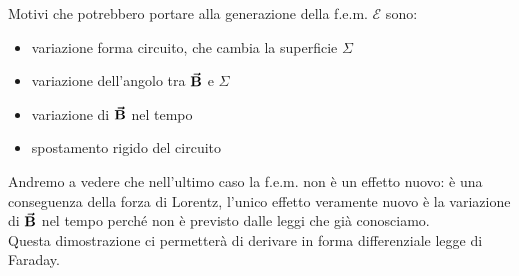 Motivi che potrebbero portare alla generazione della f.e.m. $\mathcal{E}$ sono:
\begin{itemize}
	\item variazione forma circuito, che cambia la superficie $\Sigma$
	\item variazione dell'angolo tra $\vb*{\va{B}}$ e $\Sigma$
	\item variazione di $\vb*{\va{B}}$ nel tempo
	\item spostamento rigido del circuito
\end{itemize}
Andremo a vedere che nell'ultimo caso la f.e.m. non è un effetto nuovo: è una conseguenza della forza di Lorentz,%
l'unico effetto veramente nuovo è la variazione di $\vb*{\va{B}}$ nel tempo perché non è previsto dalle leggi che già conosciamo.\\
Questa dimostrazione ci permetterà di derivare in forma differenziale legge di Faraday.
